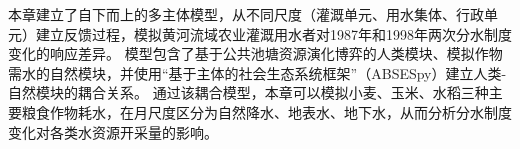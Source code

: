 
本章建立了自下而上的多主体模型，从不同尺度（灌溉单元、用水集体、行政单元）建立反馈过程，模拟黄河流域农业灌溉用水者对1987年和1998年两次分水制度变化的响应差异。
模型包含了基于公共池塘资源演化博弈的人类模块、模拟作物需水的自然模块，并使用“基于主体的社会\textendash{}生态系统框架”（ABSESpy）建立人类-自然模块的耦合关系。
通过该耦合模型，本章可以模拟小麦、玉米、水稻三种主要粮食作物耗水，在月尺度区分为自然降水、地表水、地下水，从而分析分水制度变化对各类水资源开采量的影响。
